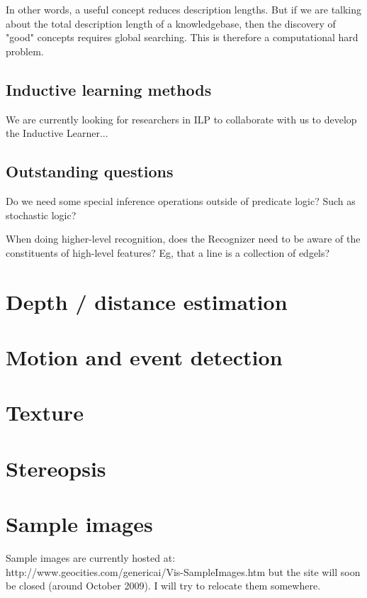  In other words, a useful concept reduces description lengths. But if we are talking about the total description length of a knowledgebase, then the discovery of "good" concepts requires global searching. This is therefore a computational hard problem. 

\subsection{Inductive learning methods}

\underconst

We are currently looking for researchers in ILP to collaborate with us to develop the Inductive Learner...

\subsection{Outstanding questions}

Do we need some special inference operations outside of predicate logic? Such as stochastic logic?

When doing higher-level recognition, does the Recognizer need to be aware of the constituents of high-level features? Eg, that a line is a collection of edgels?

\section{Depth / distance estimation}

\underconst

\section{Motion and event detection}

\underconst

\section{Texture}

\underconst

\section{Stereopsis}

\underconst

\section{Sample images}

Sample images are currently hosted at:\\
\hspace*{1cm} http://www.geocities.com/genericai/Vis-SampleImages.htm
but the site will soon be closed (around October 2009).  I will try to relocate them somewhere.
